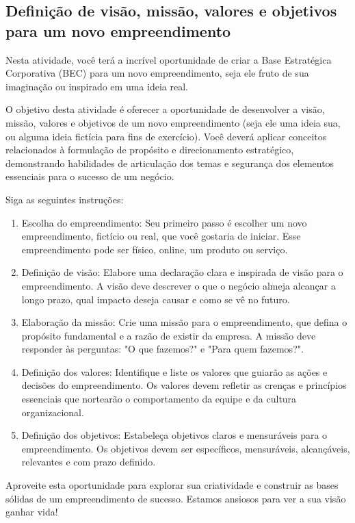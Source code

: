 \subsection{Definição de visão, missão, valores e objetivos para um novo empreendimento}

Nesta atividade, você terá a incrível oportunidade de criar a Base Estratégica Corporativa (BEC) para um novo empreendimento, seja ele fruto de sua imaginação ou inspirado em uma ideia real. 

O objetivo desta atividade é oferecer a oportunidade de desenvolver a visão, missão, valores e objetivos de um novo empreendimento (seja ele uma ideia sua, ou alguma ideia fictícia para fins de exercício). 
Você deverá aplicar conceitos relacionados à formulação de propósito e direcionamento estratégico, demonstrando habilidades de articulação dos temas e segurança dos elementos essenciais para o sucesso de um negócio.

Siga as seguintes instruções:
\begin{enumerate}
    \item Escolha do empreendimento: Seu primeiro passo é escolher um novo empreendimento, fictício ou real, que você gostaria de iniciar. 
        Esse empreendimento pode ser físico, online, um produto ou serviço.
    \item Definição de visão: Elabore uma declaração clara e inspirada de visão para o empreendimento. 
        A visão deve descrever o que o negócio almeja alcançar a longo prazo, qual impacto deseja causar e como se vê no futuro.
    \item Elaboração da missão: Crie uma missão para o empreendimento, que defina o propósito fundamental e a razão de existir da empresa. 
        A missão deve responder às perguntas: "O que fazemos?" e "Para quem fazemos?".
    \item
        Definição dos valores: Identifique e liste os valores que guiarão as ações e decisões do empreendimento. 
        Os valores devem refletir as crenças e princípios essenciais que nortearão o comportamento da equipe e da cultura organizacional.
    \item Definição dos objetivos: Estabeleça objetivos claros e mensuráveis para o empreendimento. 
        Os objetivos devem ser específicos, mensuráveis, alcançáveis, relevantes e com prazo definido.
\end{enumerate}

Aproveite esta oportunidade para explorar sua criatividade e construir as bases sólidas de um empreendimento de sucesso. 
Estamos ansiosos para ver a sua visão ganhar vida!

